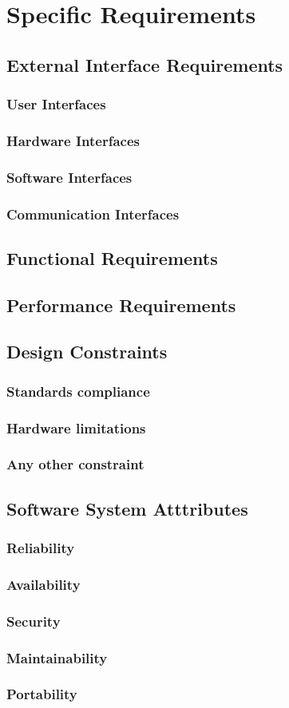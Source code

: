 \chapter{Specific Requirements}

\section{External Interface Requirements}
\subsection{User Interfaces}
\subsection{Hardware Interfaces}
\subsection{Software Interfaces}
\subsection{Communication Interfaces}

\section{Functional Requirements}

\section{Performance Requirements}

\section{Design Constraints}
\subsection{Standards compliance}
\subsection{Hardware limitations}
\subsection{Any other constraint}

\section{Software System Atttributes}
\subsection{Reliability}
\subsection{Availability}
\subsection{Security}
\subsection{Maintainability}
\subsection{Portability}

